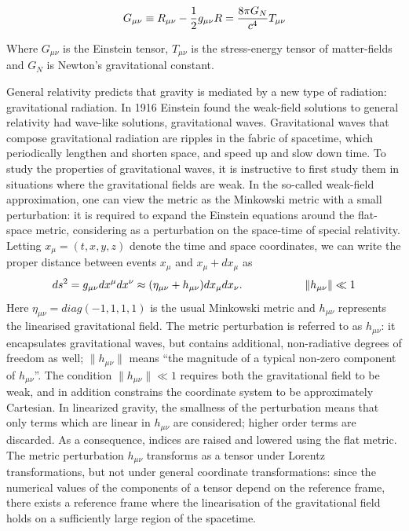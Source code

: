 \documentclass[binding=0.6cm, LaM]{sapthesis}
\begin{document}
\begin{equation}
G_{\mu\nu} \equiv R_{\mu\nu}  - {1 \over 2}g_{\mu\nu}R = {8\pi G_{N} \over {c^4}}T_{\mu\nu} 
\end{equation}

Where $G_{\mu\nu} $ is the Einstein tensor, $T_{\mu\nu} $ is the stress-energy tensor of matter-fields and $ G_{N}$ is Newton’s gravitational constant. 

General relativity predicts that gravity is mediated by a new type of radiation: gravitational radiation. 
In 1916 Einstein found the weak-field solutions to general relativity had wave-like solutions, gravitational waves. 
Gravitational waves that compose gravitational radiation are ripples in the fabric of spacetime, which periodically lengthen and shorten space, and speed up and slow down time. 
 To study the properties of gravitational waves, it is instructive to first study them in situations where the gravitational fields are weak. 
In the so-called weak-field approximation, one can view the metric as the Minkowski metric with a small perturbation: it is required to expand the Einstein equations around the flat-space metric, 
considering as a perturbation on the space-time of special relativity. 
Letting $ x_\mu = (t, x, y, z)$ denote the time and space coordinates, we can write the proper distance between events $x_{\mu}$ and
$x_{\mu} + dx_{\mu}$ as
\[
ds^2 = g_{\mu\nu}dx^{\mu}dx^{\nu} \approx (\eta_{\mu\nu} + h_{\mu\nu})dx_{\mu}dx_{\nu}. \hspace*{2cm}\|h_{\mu\nu}\|\ll 1
\]
Here $\eta_{\mu\nu} = diag(-1,1,1,1)$ is the usual Minkowski metric and
 $h_{\mu\nu}$ represents the linearised gravitational field.
The metric perturbation is referred to as  $h_{\mu\nu}$: it encapsulates gravitational waves, but contains additional, non-radiative degrees of freedom as well; $\|h_{\mu\nu}\|$ means 
“the magnitude of a typical non-zero component of $h_{\mu\nu}$”. The condition $\|h_{\mu\nu}\|\ll 1$ requires both the gravitational field to be weak, and in addition constrains the 
coordinate system to be approximately Cartesian.  In linearized gravity, the smallness of the perturbation means that only terms which are linear in $h_{\mu\nu}$ are considered; 
higher order terms are discarded. As a consequence, indices are raised and lowered using the flat metric. 
The metric perturbation $h_{\mu\nu}$ transforms as a tensor under Lorentz transformations, but not under general coordinate transformations: since the numerical values of the components 
of a tensor depend on the reference frame, there exists a reference frame where the linearisation of the gravitational field holds on a sufficiently large region of the spacetime. 
\end{document}
